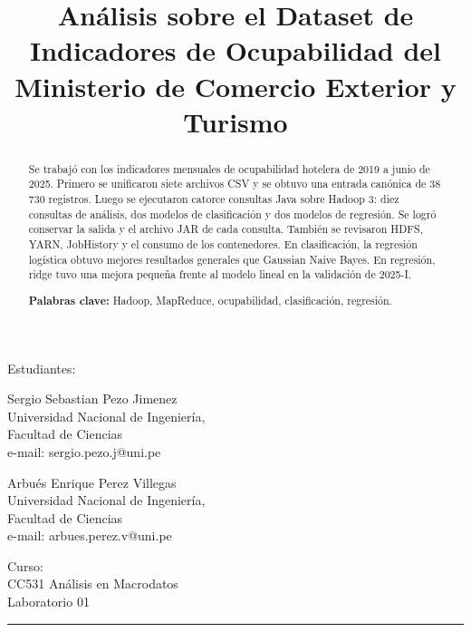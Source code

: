 \documentclass[10pt,a4paper]{article}
\theoremstyle{definition}
\begin{document}
\title{Análisis sobre el Dataset de Indicadores de Ocupabilidad del Ministerio de Comercio Exterior y Turismo}
\date{}
\maketitle
\begin{center}
Estudiantes:\\[4pt]
\begin{minipage}[t]{0.45\textwidth}
\centering
{\large Sergio Sebastian Pezo Jimenez}\\[3pt]
Universidad Nacional de Ingenier\'ia,\\ Facultad de Ciencias\\
e-mail: sergio.pezo.j@uni.pe
\end{minipage}\hfill
\begin{minipage}[t]{0.45\textwidth}
\centering
{\large Arbués Enrique Perez Villegas}\\[3pt]
Universidad Nacional de Ingenier\'ia,\\ Facultad de Ciencias\\
e-mail: arbues.perez.v@uni.pe
\end{minipage}
\end{center}
\vspace{5pt}
\begin{center}
Curso:\\[5pt]
{\large CC531 Análisis en Macrodatos}\\
{\large Laboratorio 01}
\end{center}

\vspace{20pt}
\begin{abstract}
{\small
Se trabajó con los indicadores mensuales de ocupabilidad hotelera de 2019 a
junio de 2025. Primero se unificaron siete archivos CSV y se obtuvo una entrada
canónica de 38 730 registros. Luego se ejecutaron catorce consultas Java sobre
Hadoop 3: diez consultas de análisis, dos modelos de clasificación y dos
modelos de regresión. Se logró conservar la salida y el archivo JAR de cada
consulta. También se revisaron HDFS, YARN, JobHistory y el consumo de los
contenedores. En clasificación, la regresión logística obtuvo mejores
resultados generales que Gaussian Naive Bayes. En regresión, ridge tuvo una
mejora pequeña frente al modelo lineal en la validación de 2025-I.

\textbf{Palabras clave:} Hadoop, MapReduce, ocupabilidad, clasificación,
regresión.
}
\end{abstract}
\tableofcontents
\vspace{20pt}\hrule\vspace{10pt}
\end{document}
